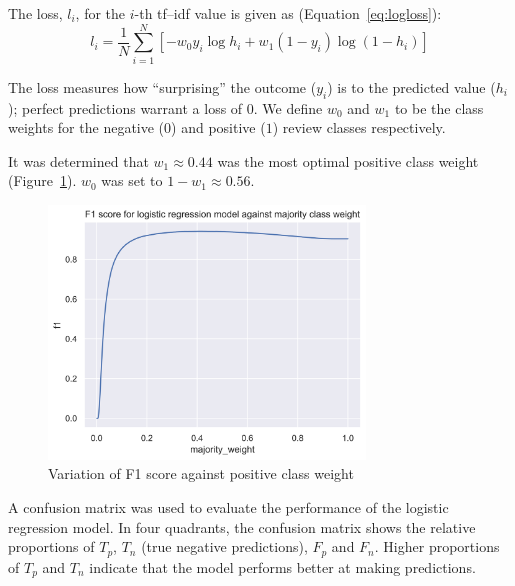 \documentclass[12pt, a4paper]{pancake-article}
\begin{document}
The loss, \(l_i\), for the \(i\)-th tf--idf value is given as (Equation~\ref{eq:logloss}):
\begin{equation}
	l_i = \frac{1}{N} \sum^{N}_{i = 1}\left[-w_0 y_i \log h_i + w_1\left(1 - y_i\right) \log \left(1 - h_i\right)\right]
	\label{eq:logloss}
\end{equation}

The loss measures how ``surprising'' the outcome ($y_i$) is to the predicted
value ($h_i$); perfect predictions warrant a loss of $0$. We define $w_0$ and $w_1$
to be the class weights for the negative ($0$) and positive ($1$) review classes
respectively.

It was determined that $w_1 \approx 0.44$ was the most optimal positive class weight (Figure~\ref{fig:f1-variation}).
$w_0$ was set to $1 - w_1 \approx 0.56$.

\begin{figure}
	\begin{center}
		\includegraphics[width=0.75\textwidth]{../results/logistic_f1.png}
	\end{center}
	\caption{Variation of F1 score against positive class weight}\label{fig:f1-variation}
\end{figure}

A confusion matrix was used to evaluate the performance of the logistic regression model. In
four quadrants, the confusion matrix shows the relative proportions of $T_p$, $T_n$ (true negative
predictions), $F_p$ and $F_n$. Higher proportions of $T_p$ and $T_n$ indicate that the model performs
better at making predictions.
\end{document}
